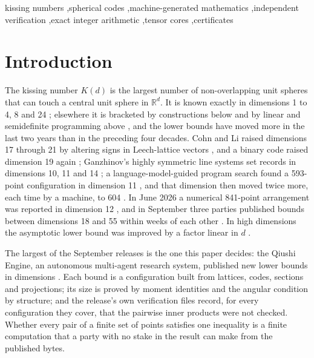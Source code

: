 \documentclass[preprint,11pt,authoryear,a4paper]{elsarticle}
\newcommand{\R}{\mathbb{R}}
\begin{document}
\begin{frontmatter}
\begin{keyword}
kissing numbers \sep spherical codes \sep machine-generated mathematics \sep independent verification \sep exact integer arithmetic \sep tensor cores \sep certificates
\end{keyword}

\end{frontmatter}

\section{Introduction}\label{sec:intro}

The kissing number $K(d)$ is the largest number of non-overlapping unit spheres that can touch a central unit sphere in $\R^d$. It is known exactly in dimensions 1 to 4, 8 and 24 \citep{Leech67,OdlyzkoSloane79,Musin08,ConwaySloane99}; elsewhere it is bracketed by constructions below and by linear and semidefinite programming above \citep{BachocVallentin08,MittelmannVallentin10,LeijenhorstDeLaat24}, and the lower bounds have moved more in the last two years than in the preceding four decades. Cohn and Li raised dimensions 17 through 21 by altering signs in Leech-lattice vectors \citep{CohnLi24}, and a binary code raised dimension 19 again \citep{Ho26}; Ganzhinov's highly symmetric line systems set records in dimensions 10, 11 and 14 \citep{Ganzhinov22}; a language-model-guided program search found a 593-point configuration in dimension 11 \citep{Novikov25,GGSWT25}, and that dimension then moved twice more, each time by a machine, to 604 \citep[the dimension-eleven paper]{CMArchive}. In June 2026 a numerical 841-point arrangement was reported in dimension 12 \citep{TakhanovAssylbekovYun26}, and in September three parties published bounds between dimensions 18 and 55 within weeks of each other \citep{Kravatskiy26,TakhanovYun26,Yang26}. In high dimensions the asymptotic lower bound was improved by a factor linear in $d$ \citep{JenssenJoosPerkins18,FKLP21}.

The largest of the September releases is the one this paper decides: the Qiushi Engine, an autonomous multi-agent research system, published \MtKwRows{} new lower bounds in dimensions \MtKwDims{} \citep{Yang26}. Each bound is a configuration built from lattices, codes, sections and projections; its size is proved by moment identities and the angular condition by structure; and the release's own verification files record, for every configuration they cover, that the pairwise inner products were not checked. Whether every pair of a finite set of points satisfies one inequality is a finite computation that a party with no stake in the result can make from the published bytes.
\end{document}
